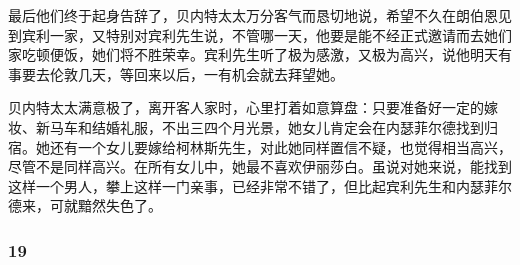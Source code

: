 \par 最后他们终于起身告辞了，贝内特太太万分客气而恳切地说，希望不久在朗伯恩见到宾利一家，又特别对宾利先生说，不管哪一天，他要是能不经正式邀请而去她们家吃顿便饭，她们将不胜荣幸。宾利先生听了极为感激，又极为高兴，说他明天有事要去伦敦几天，等回来以后，一有机会就去拜望她。
\par 贝内特太太满意极了，离开客人家时，心里打着如意算盘：只要准备好一定的嫁妆、新马车和结婚礼服，不出三四个月光景，她女儿肯定会在内瑟菲尔德找到归宿。她还有一个女儿要嫁给柯林斯先生，对此她同样置信不疑，也觉得相当高兴，尽管不是同样高兴。在所有女儿中，她最不喜欢伊丽莎白。虽说对她来说，能找到这样一个男人，攀上这样一门亲事，已经非常不错了，但比起宾利先生和内瑟菲尔德来，可就黯然失色了。



\subsubsection*{19}

